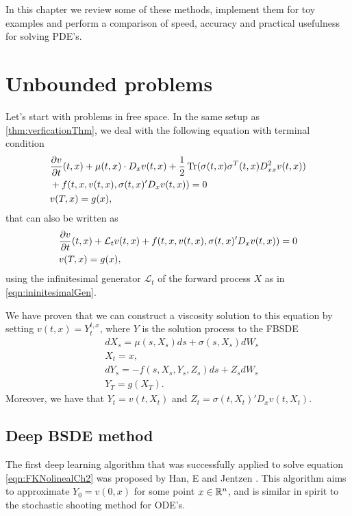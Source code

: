 In this chapter we review some of these methods, implement them for toy examples and perform a comparison of speed, accuracy and practical usefulness for solving PDE's.   

\section{Unbounded problems}
Let's start with problems in free space. In the same setup as \autoref{thm:verficationThm}, we deal with the following equation with terminal condition
\begin{equation}
	\label{eqn:FKNolinealCh2}
	\begin{split}
		&\frac{\partial v}{\partial t}(t,x)+\mu(t,x)\cdot D_x v(t,x)+\frac{1}{2}\operatorname{Tr}(\sigma(t,x)\sigma^{T}(t,x)D_{xx}^2v(t,x))\\
		&+f(t,x,v(t,x),\sigma(t,x)' D_x v(t,x))=0\\
		&v(T,x)=g(x),
	\end{split}
\end{equation}
that can also be written as 
\begin{equation}
	\label{eqn:FKNolinealLCh2}
	\begin{split}
	&\frac{\partial v}{\partial t}(t,x)+\mathcal{L}_t v(t,x)+f(t,x,v(t,x),\sigma(t,x)' D_x v(t,x))=0\\
	&v(T,x)=g(x),
   \end{split}
\end{equation}
using the infinitesimal generator $\mathcal{L}_t$ of the forward process $X$ as in \eqref{eqn:ininitesimalGen}.

We have proven that we can construct a viscosity solution to this equation by setting $v(t,x)=Y_{t}^{t,x}$, where $Y$ is the solution process to the FBSDE
\begin{equation}
	\label{eqn:UncoupledCh2}
	\begin{split}
		&dX_s=\mu(s,X_s)ds+\sigma(s,X_s)dW_s\\
		&X_t=x,\\
		&dY_s=-f(s,X_s,Y_s,Z_s)ds+Z_s dW_s\\
		&Y_T=g(X_T).
	\end{split}
\end{equation}
Moreover, we have that $Y_t=v(t,X_t)$ and $Z_t=\sigma(t,X_t)'D_x v(t,X_t)$.
\subsection{Deep BSDE method}
The first deep learning algorithm that was successfully applied to solve equation \eqref{eqn:FKNolinealCh2} was proposed by Han, E and Jentzen \cite{han_solving_2018,e_deep_2017}. This algorithm aims to approximate $Y_0=v(0,x)$ for some point $x\in \mathbb{R}^n$, and is similar in spirit to the stochastic shooting method for ODE's.

